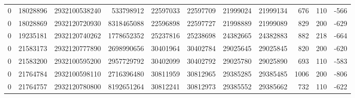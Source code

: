 \begin{tabular}{rrrrrrrrrrr}
0 & 18028896 & 2932100538240 & 533798912 & 22597033 & 22597709 & 21999024 & 21999134 & 676 & 110 & -566 \\
0 & 18028869 & 2932120720930 & 8318465088 & 22596898 & 22597727 & 21998889 & 21999089 & 829 & 200 & -629 \\
0 & 19235181 & 2932120740262 & 1778652352 & 25237816 & 25238698 & 24382665 & 24382883 & 882 & 218 & -664 \\
0 & 21583173 & 2932120777890 & 2698990656 & 30401964 & 30402784 & 29025645 & 29025845 & 820 & 200 & -620 \\
0 & 21583200 & 2932100595200 & 2957729792 & 30402099 & 30402792 & 29025780 & 29025890 & 693 & 110 & -583 \\
0 & 21764784 & 2932100598110 & 2716396480 & 30811959 & 30812965 & 29385285 & 29385485 & 1006 & 200 & -806 \\
0 & 21764757 & 2932120780800 & 8192651264 & 30812241 & 30812973 & 29385552 & 29385662 & 732 & 110 & -622 \\
\bottomrule
\end{tabular}
